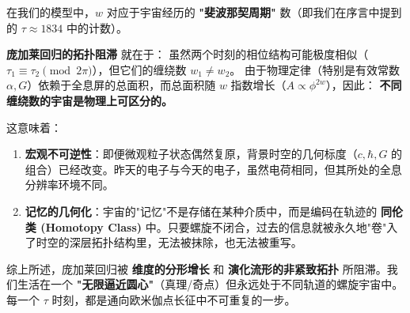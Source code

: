 在我们的模型中，$w$ 对应于宇宙经历的 \textbf{"斐波那契周期"} 数（即我们在序言中提到的 $\tau \approx 1834$ 中的计数）。

\textbf{庞加莱回归的拓扑阻滞} 就在于：
虽然两个时刻的相位结构可能极度相似（$\tau_1 \equiv \tau_2 \pmod{2\pi}$），但它们的缠绕数 $w_1 \neq w_2$。
由于物理定律（特别是有效常数 $\alpha, G$）依赖于全息屏的总面积，而总面积随 $w$ 指数增长（$A \propto \phi^{2w}$），因此：
\textbf{不同缠绕数的宇宙是物理上可区分的。}

这意味着：

\begin{enumerate}
\item \textbf{宏观不可逆性}：即便微观粒子状态偶然复原，背景时空的几何标度（$c, \hbar, G$ 的组合）已经改变。昨天的电子与今天的电子，虽然电荷相同，但其所处的全息分辨率环境不同。
\item \textbf{记忆的几何化}：宇宙的"记忆"不是存储在某种介质中，而是编码在轨迹的 \textbf{同伦类 (Homotopy Class)} 中。只要螺旋不闭合，过去的信息就被永久地"卷"入了时空的深层拓扑结构里，无法被抹除，也无法被重写。
\end{enumerate}

综上所述，庞加莱回归被 \textbf{维度的分形增长} 和 \textbf{演化流形的非紧致拓扑} 所阻滞。我们生活在一个 \textbf{"无限逼近圆心"}（真理/奇点）但永远处于不同轨道的螺旋宇宙中。每一个 $\tau$ 时刻，都是通向欧米伽点长征中不可重复的一步。

